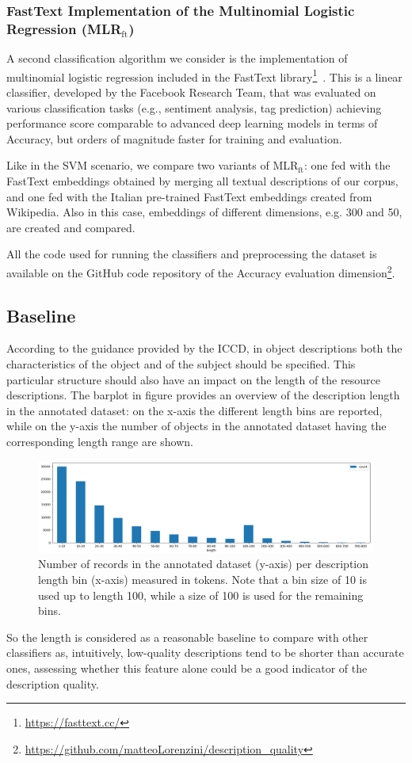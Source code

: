 \documentclass[epsfig,a4paper,12pt,titlepage]{book}
\newcommand{\mlr}{MLR$_\text{ft}$\xspace}
\begin{document}
\subsubsection{FastText Implementation of the Multinomial Logistic Regression (\mlr)} 

A second classification algorithm we consider is the implementation of multinomial logistic regression included in the FastText library\footnote{\url{https://fasttext.cc/}}~\cite{joulin-etal-2017-bag}. This is a linear classifier, developed by the Facebook Research Team, that was evaluated on various classification tasks (e.g., sentiment analysis, tag prediction) achieving performance score comparable to advanced deep learning models in terms of Accuracy, but orders of magnitude faster for training and evaluation.

Like in the SVM scenario, we compare two variants of \mlr: one fed with the FastText  embeddings obtained by merging all textual descriptions of our corpus, and one fed with the Italian pre-trained FastText embeddings created from Wikipedia. Also in this case, embeddings of different dimensions, e.g. 300 and 50, are created and compared.


All the code used for running the classifiers and preprocessing the dataset is available on the GitHub code repository of the Accuracy evaluation dimension\footnote{\url{https://github.com/matteoLorenzini/description_quality}}.

\subsection{Baseline} 

According to the guidance provided by the ICCD, in object descriptions both the characteristics of the object and of the subject should be specified. This particular structure should also have an impact on the length of the resource descriptions. The barplot in figure provides an overview of the description length in the annotated dataset: on the x-axis the different length bins are reported, while on the y-axis the number of objects in the annotated dataset having the corresponding length range are shown.
\begin{figure}[h!]
\includegraphics[width=16cm]{length1.PNG}
\caption{Number of records in the annotated dataset (y-axis) per description length bin (x-axis) measured in tokens. Note that a bin size of 10 is used up to length 100, while a size of 100 is used for the remaining bins.}
\label{magnificat}
\end{figure}
So the length is considered as a reasonable baseline to compare with other classifiers as, intuitively, low-quality descriptions tend to be shorter than accurate ones, assessing whether this feature alone could be a good indicator of the description quality. 
\end{document}
